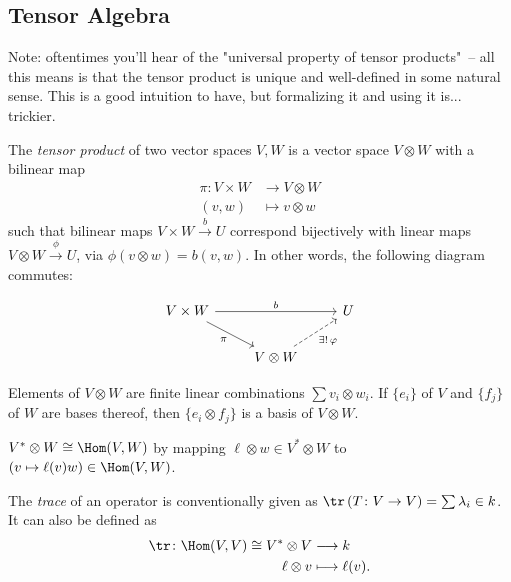\documentclass{notes}
\begin{document}
\subsection{Tensor Algebra}

Note: oftentimes you'll hear of the "universal property of tensor products" – all this means is that the tensor product is unique and well-defined in some natural sense. This is a good intuition to have, but formalizing it and using it is... trickier.

\begin{defn}
    The \emph{tensor product} of two vector spaces $V,W$ is a vector space $V\otimes W$ with a bilinear map 
    \begin{align*}
        \pi \colon V\times W &\longrightarrow V\otimes W \\
        (v,w) &\longmapsto v\otimes w
    \end{align*}
    such that bilinear maps $V\times W \xrightarrow{b} U$ correspond bijectively with linear maps $V\otimes W\xrightarrow{\phi} U$, via $\phi (v\otimes w)=b(v,w)$. In other words, the following diagram commutes:

    \[\begin{tikzcd}
	{V\times W} && U \\
	& {V\otimes W}
	\arrow["{\exists! \,\varphi}"', dashed, from=2-2, to=1-3]
	\arrow["b", from=1-1, to=1-3]
	\arrow["\pi"', from=1-1, to=2-2]
    \end{tikzcd}\]

    Elements of $V\otimes W$ are finite linear combinations $\sum v_i\otimes w_i$. If $\{{e}_i\}$ of $V$ and $\{{f}_j\}$ of $W$ are bases thereof, then $\{{e_i\otimes f_j}\}$ is a basis of $V\otimes W$.
\end{defn}

\begin{example}
    $V^{*}\otimes W\cong \Hom (V,W)$ by mapping $\ell \otimes w\in V^{*}\otimes W$ to $(v\mapsto \ell (v)w)\in \Hom (V,W)$.
\end{example}

\begin{defn}
    The \emph{trace} of an operator is conventionally given as $\tr \left( T\colon V \to V  \right) =\sum \lambda _i \in k$. It can also be defined as
    \begin{align*}
        \tr \colon \Hom (V,V)\cong V^{*}\otimes V &\longrightarrow k \\
        \ell \otimes v &\longmapsto \ell (v)
    .\end{align*}
\end{defn}
\end{document}
